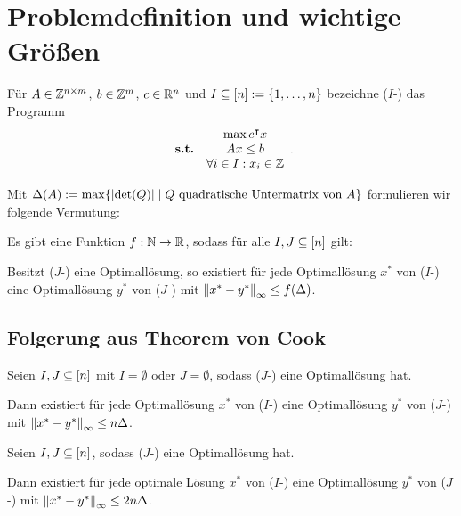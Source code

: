 \section{Problemdefinition und wichtige Größen}

\begin{frame}
	\begin{definition}
		Für $A\in\mathbb{Z}^{n\times m}$, $b\in\mathbb{Z}^m$, $c\in\mathbb{R}^n$ und $I\subseteq[n]:=\{1,\dots,n\}$ bezeichne ($I$-\MIPI) das Programm
		$$\begin{array}{lc}
		&\max c^\intercal x \\
		\textbf{s.t.} &Ax\leq b\\
		&\forall i\in I: x_i\in\mathbb{Z}
		\end{array}.$$
	\end{definition}

	\pause
	Mit $\Delta(A):=\max\{\lvert  \det(Q) \rvert \mid Q \text{ quadratische Untermatrix von } A \}$ formulieren wir folgende Vermutung:
	
	\pause
	\begin{conjecture}
		Es gibt eine Funktion $f: \mathbb{N}\rightarrow\mathbb{R}$, sodass für alle $I,J\subseteq[n]$ gilt:
		
		Besitzt ($J$-\MIPI) eine Optimallösung, so existiert für jede Optimallösung $x^*$ von ($I$-\MIPI) eine Optimallösung $y^*$ von ($J$-\MIPI) mit $\left\lVert x^* - y^*\right\rVert_\infty\leq f(\Delta)$.
	\end{conjecture}
\end{frame}

\subsection{Folgerung aus Theorem von Cook}
\begin{frame}
\begin{theorem}[Cook u. a., 1986]\label{thm:cook}
	Seien $I, J\subseteq[n]$ mit $I=\emptyset$ oder $J=\emptyset$, sodass ($J$-\MIPI) eine Optimallösung hat.
	
	Dann existiert für jede Optimallösung $x^*$ von ($I$-\MIPI) eine Optimallösung $y^*$ von ($J$-\MIPI) mit $\left\lVert x^*-y^*\right\rVert_\infty\leq n\Delta$.
\end{theorem}
\begin{korollar}
	Seien $I,J\subseteq[n]$, sodass ($J$-\MIPI) eine Optimallösung hat.
	
	Dann existiert für jede optimale Lösung $x^*$ von ($I$-\MIPI) eine Optimallösung $y^*$ von ($J$-\MIPI) mit $\left\lVert x^*-y^*\right\rVert_\infty\leq2 n\Delta$.
\end{korollar}
\end{frame}

